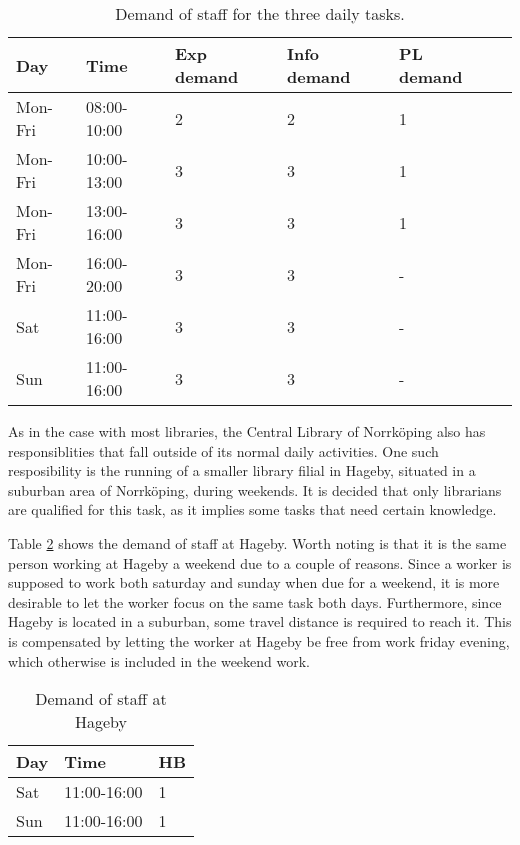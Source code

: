 \begin{table}[h]
\centering
\caption{Demand of staff for the three daily tasks.}
\label{tab:Outer_Task_Demand}
\begin{tabularx}{\textwidth}{|X|l|l|l|l|X|}
\hline
\textbf{Day} & \textbf{Time} & \textbf{Exp demand} & \textbf{Info demand} & \textbf{PL demand}
\\ \hline 
Mon-Fri & 08:00-10:00 & 2 & 2 & 1
\\ \hline 
Mon-Fri & 10:00-13:00 & 3 & 3 & 1
\\ \hline 
Mon-Fri & 13:00-16:00  & 3 & 3 & 1
\\ \hline 
Mon-Fri & 16:00-20:00 & 3 & 3 & -
\\ \hline 
Sat & 11:00-16:00  & 3 & 3 & -
\\ \hline 
Sun & 11:00-16:00  & 3 & 3 & -
\\ \hline 
\end{tabularx}
\end{table} 


As in the case with most libraries, the Central Library of Norrköping also has responsiblities that fall outside of its normal daily activities. One such resposibility is the running of a smaller library filial in Hageby, situated in a suburban area of Norrköping, during weekends. It is decided that only librarians are qualified for this task, as it implies some tasks that need certain knowledge.

Table \ref{tab:Hageby_Demand} shows the demand of staff at Hageby. Worth noting is that it is the same person working at Hageby a weekend due to a couple of reasons. Since a worker is supposed to work both saturday and sunday when due for a weekend, it is more desirable to let the worker focus on the same task both days. Furthermore, since Hageby is located in a suburban, some travel distance is required to reach it. This is compensated by letting the worker at Hageby be free from work friday evening, which otherwise is included in the weekend work. 

\begin{table}[H]
\centering
\caption{Demand of staff at Hageby}
\label{tab:Hageby_Demand}
\begin{tabularx}{0.5\textwidth}{|l|l|X|}
\hline
\textbf{Day} & \textbf{Time} & \textbf{HB}
\\ \hline 
Sat & 11:00-16:00  & 1 
\\ \hline 
Sun & 11:00-16:00  & 1 
\\ \hline 
\end{tabularx}
\end{table} 

